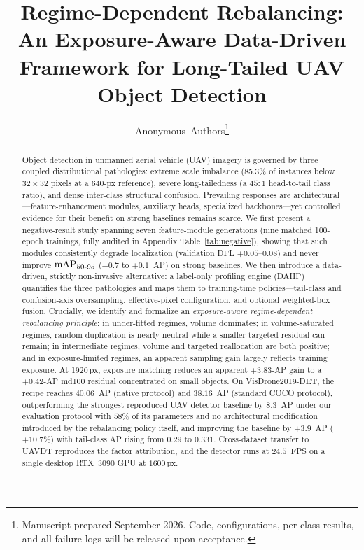 \documentclass[journal]{IEEEtran}
\newcommand{\map}{\textup{mAP}}
\newcommand{\ap}{\textup{AP}}
\newcommand{\visdrone}{VisDrone2019-DET}
\newcommand{\uavdt}{UAVDT}
\begin{document}
\title{Regime-Dependent Rebalancing: An Exposure-Aware Data-Driven Framework for Long-Tailed UAV Object Detection}

\author{Anonymous~Authors\thanks{Manuscript prepared September 2026. Code, configurations, per-class results, and all failure logs will be released upon acceptance.}}

\maketitle

\begin{abstract}
Object detection in unmanned aerial vehicle (UAV) imagery is governed by three coupled distributional pathologies: extreme scale imbalance (85.3\% of instances below $32{\times}32$ pixels at a 640-px reference), severe long-tailedness (a $45{:}1$ head-to-tail class ratio), and dense inter-class structural confusion. Prevailing responses are architectural---feature-enhancement modules, auxiliary heads, specialized backbones---yet controlled evidence for their benefit on strong baselines remains scarce. We first present a negative-result study spanning seven feature-module generations (nine matched 100-epoch trainings, fully audited in Appendix Table~\ref{tab:negative}), showing that such modules consistently degrade localization (validation DFL $+0.05$--$0.08$) and never improve $\map_{50\text{-}95}$ ($-0.7$ to $+0.1$~\ap) on strong baselines. We then introduce a data-driven, strictly non-invasive alternative: a label-only profiling engine (DAHP) quantifies the three pathologies and maps them to training-time policies---tail-class and confusion-axis oversampling, effective-pixel configuration, and optional weighted-box fusion. Crucially, we identify and formalize an \emph{exposure-aware regime-dependent rebalancing principle}: in under-fitted regimes, volume dominates; in volume-saturated regimes, random duplication is nearly neutral while a smaller targeted residual can remain; in intermediate regimes, volume and targeted reallocation are both positive; and in exposure-limited regimes, an apparent sampling gain largely reflects training exposure. At 1920\,px, exposure matching reduces an apparent $+3.83$-\ap{} gain to a $+0.42$-\ap{} md100 residual concentrated on small objects. On \visdrone{}, the recipe reaches $40.06$~\ap{} (native protocol) and $38.16$~\ap{} (standard COCO protocol), outperforming the strongest reproduced UAV detector baseline by $8.3$~\ap{} under our evaluation protocol with $58\%$ of its parameters and no architectural modification introduced by the rebalancing policy itself, and improving the baseline by $+3.9$~\ap{} ($+10.7\%$) with tail-class \ap{} rising from $0.29$ to $0.331$. Cross-dataset transfer to \uavdt{} reproduces the factor attribution, and the detector runs at $24.5$~FPS on a single desktop RTX~3090 GPU at $1600$\,px.
\end{abstract}
\end{document}
